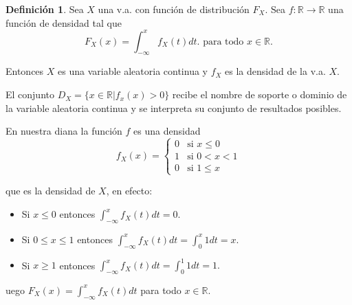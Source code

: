 \documentclass[handout]{beamer}\usepackage[]{graphicx}\usepackage[]{color}
\newcommand{\RR}{\mathbb{R}}
\renewcommand{\leq}{\leqslant}
\renewcommand{\geq}{\geqslant}
\theoremstyle{plain}
\theoremstyle{definition}
\newtheorem{definicion}{Definición}
\begin{document}
\begin{frame}
\begin{definicion}
Sea $X$ una v.a. con función de distribución $F_X$. Sea $f:\RR\to\RR$ una función de
densidad tal que
$$F_X(x)=\int_{-\infty}^{x} f_X(t) dt.\mbox{ para todo } x\in\RR.$$

Entonces $X$ es una variable aleatoria continua y $f_X$ es la densidad de la v.a.  $X$.

El conjunto $D_X=\{x\in\RR| f_x(x)>0\}$ recibe el nombre de soporte o dominio de la
variable aleatoria continua y se interpreta su conjunto de resultados posibles.
\end{definicion}
\end{frame}

\begin{frame}

En nuestra diana la función $f$ es una densidad
$$f_{X}(x)=\left\{
\begin{array}{ll}
0 & \mbox{si } x\leq 0\\
1 & \mbox{si } 0 < x < 1\\
0 & \mbox{si } 1\leq x
\end{array}\right.
$$
\end{frame}

\begin{frame}
que    es la densidad de $X$, en efecto:

\begin{itemize}
\item Si $x \leq 0$ entonces $\int_{-\infty}^x f_X(t) dt = 0.$
\item  Si $0\leq x\leq 1$ entonces $\int_{-\infty}^x f_X(t) dt =
\int_{0}^x 1 dt = x.$
\item Si $x\geq 1$  entonces $\int_{-\infty}^x f_X(t) dt =
\int_{0}^1 1 dt = 1.$
\end{itemize}

uego $F_X(x)=\int_{-\infty}^x f_X(t) dt$ para todo $x\in\RR.$
\end{frame}
\end{document}
